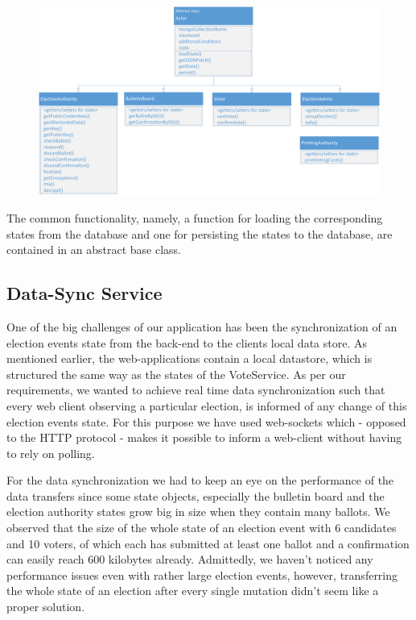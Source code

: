 \begin{figure}
\begin{center}
\includegraphics[scale=0.60]{assets/uml_actors.pdf}
\label{Actor classes}%
\end{center}
\end{figure}
The common functionality, namely, a function for loading the corresponding states from the database and one for persisting the states to the database, are contained in an abstract base class.

\newpage
\subsection{Data-Sync Service}
One of the big challenges of our application has been the synchronization of an election events state from the back-end to the clients local data store. As mentioned earlier, the web-applications contain a local datastore, which is structured the same way as the states of the VoteService. As per our requirements, we wanted to achieve real time data synchronization such that every web client observing a particular election, is informed of any change of this election events state. For this purpose we have used web-sockets which - opposed to the HTTP protocol - makes it possible to inform a web-client without having to rely on polling.

For the data synchronization we had to keep an eye on the performance of the data transfers since some state objects, especially the bulletin board and the election authority states grow big in size when they contain many ballots. We observed that the size of the whole state of an election event with 6 candidates and 10 voters, of which each has submitted at least one ballot and a confirmation can easily reach 600 kilobytes already. Admittedly, we haven't noticed any performance issues even with rather large election events, however, transferring the whole state of an election after every single mutation didn't seem like a proper solution.

